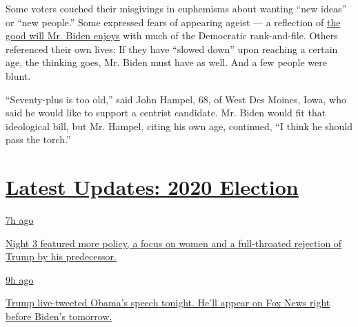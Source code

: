 Some voters couched their misgivings in euphemisms about wanting ``new
ideas'' or ``new people.'' Some expressed fears of appearing ageist ---
a reflection of
\href{https://www.nytimes3xbfgragh.onion/2019/04/28/us/politics/biden-pennsylvania-2020.html}{the
good will Mr. Biden enjoys} with much of the Democratic rank-and-file.
Others referenced their own lives: If they have ``slowed down'' upon
reaching a certain age, the thinking goes, Mr. Biden must have as well.
And a few people were blunt.

``Seventy-plus is too old,'' said John Hampel, 68, of West Des Moines,
Iowa, who said he would like to support a centrist candidate. Mr. Biden
would fit that ideological bill, but Mr. Hampel, citing his own age,
continued, ``I think he should pass the torch.''

\hypertarget{latest-updates-2020-election}{%
\section{\texorpdfstring{\href{https://www.nytimes3xbfgragh.onion/live/2020/08/19/us/dnc-convention-election?action=click\&pgtype=Article\&state=default\&region=MAIN_CONTENT_1\&context=storylines_live_updates}{Latest
Updates: 2020
Election}}{Latest Updates: 2020 Election}}\label{latest-updates-2020-election}}

\href{https://www.nytimes3xbfgragh.onion/live/2020/08/19/us/dnc-convention-election?action=click\&pgtype=Article\&state=default\&region=MAIN_CONTENT_1\&context=storylines_live_updates\#night-3-featured-more-policy-a-focus-on-women-and-a-full-throated-rejection-of-trump-by-his-predecessor}{7h
ago}

\href{https://www.nytimes3xbfgragh.onion/live/2020/08/19/us/dnc-convention-election?action=click\&pgtype=Article\&state=default\&region=MAIN_CONTENT_1\&context=storylines_live_updates\#night-3-featured-more-policy-a-focus-on-women-and-a-full-throated-rejection-of-trump-by-his-predecessor}{Night
3 featured more policy, a focus on women and a full-throated rejection
of Trump by his predecessor.}

\href{https://www.nytimes3xbfgragh.onion/live/2020/08/19/us/dnc-convention-election?action=click\&pgtype=Article\&state=default\&region=MAIN_CONTENT_1\&context=storylines_live_updates\#trump-live-tweeted-obamas-speech-tonight-hell-appear-on-fox-news-right-before-bidens-tomorrow}{9h
ago}

\href{https://www.nytimes3xbfgragh.onion/live/2020/08/19/us/dnc-convention-election?action=click\&pgtype=Article\&state=default\&region=MAIN_CONTENT_1\&context=storylines_live_updates\#trump-live-tweeted-obamas-speech-tonight-hell-appear-on-fox-news-right-before-bidens-tomorrow}{Trump
live-tweeted Obama's speech tonight. He'll appear on Fox News right
before Biden's tomorrow.}

